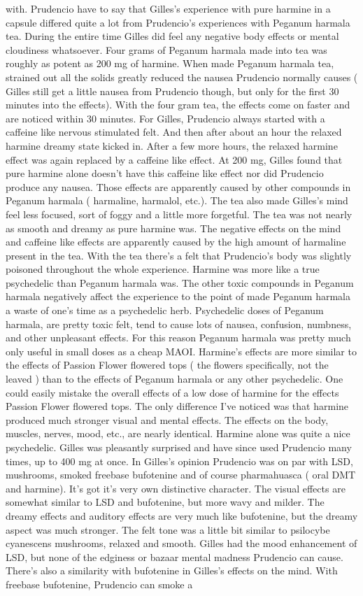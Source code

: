 \documentclass[12pt]{book}
\begin{document}
with. Prudencio have to say that Gilles's experience with pure harmine in a capsule differed quite a lot from Prudencio's experiences with Peganum harmala tea. During the entire time Gilles did feel any negative body effects or mental cloudiness whatsoever. Four grams of Peganum harmala made into tea was roughly as potent as 200 mg of harmine. When made Peganum harmala tea, strained out all the solids greatly reduced the nausea Prudencio normally causes ( Gilles still get a little nausea from Prudencio though, but only for the first 30 minutes into the effects). With the four gram tea, the effects come on faster and are noticed within 30 minutes. For Gilles, Prudencio always started with a caffeine like nervous stimulated felt. And then after about an hour the relaxed harmine dreamy state kicked in. After a few more hours, the relaxed harmine effect was again replaced by a caffeine like effect. At 200 mg, Gilles found that pure harmine alone doesn't have this caffeine like effect nor did Prudencio produce any nausea. Those effects are apparently caused by other compounds in Peganum harmala ( harmaline, harmalol, etc.). The tea also made Gilles's mind feel less focused, sort of foggy and a little more forgetful. The tea was not nearly as smooth and dreamy as pure harmine was. The negative effects on the mind and caffeine like effects are apparently caused by the high amount of harmaline present in the tea. With the tea there's a felt that Prudencio's body was slightly poisoned throughout the whole experience. Harmine was more like a true psychedelic than Peganum harmala was. The other toxic compounds in Peganum harmala negatively affect the experience to the point of made Peganum harmala a waste of one's time as a psychedelic herb. Psychedelic doses of Peganum harmala, are pretty toxic felt, tend to cause lots of nausea, confusion, numbness, and other unpleasant effects. For this reason Peganum harmala was pretty much only useful in small doses as a cheap MAOI. Harmine's effects are more similar to the effects of Passion Flower flowered tops ( the flowers specifically, not the leaved ) than to the effects of Peganum harmala or any other psychedelic. One could easily mistake the overall effects of a low dose of harmine for the effects Passion Flower flowered tops. The only difference I've noticed was that harmine produced much stronger visual and mental effects. The effects on the body, muscles, nerves, mood, etc., are nearly identical. Harmine alone was quite a nice psychedelic. Gilles was pleasantly surprised and have since used Prudencio many times, up to 400 mg at once. In Gilles's opinion Prudencio was on par with LSD, mushrooms, smoked freebase bufotenine and of course pharmahuasca ( oral DMT and harmine). It's got it's very own distinctive character. The visual effects are somewhat similar to LSD and bufotenine, but more wavy and milder. The dreamy effects and auditory effects are very much like bufotenine, but the dreamy aspect was much stronger. The felt tone was a little bit similar to psilocybe cyanescens mushrooms, relaxed and smooth. Gilles had the mood enhancement of LSD, but none of the edginess or bazaar mental madness Prudencio can cause. There's also a similarity with bufotenine in Gilles's effects on the mind. With freebase bufotenine, Prudencio can smoke a 
\end{document}
